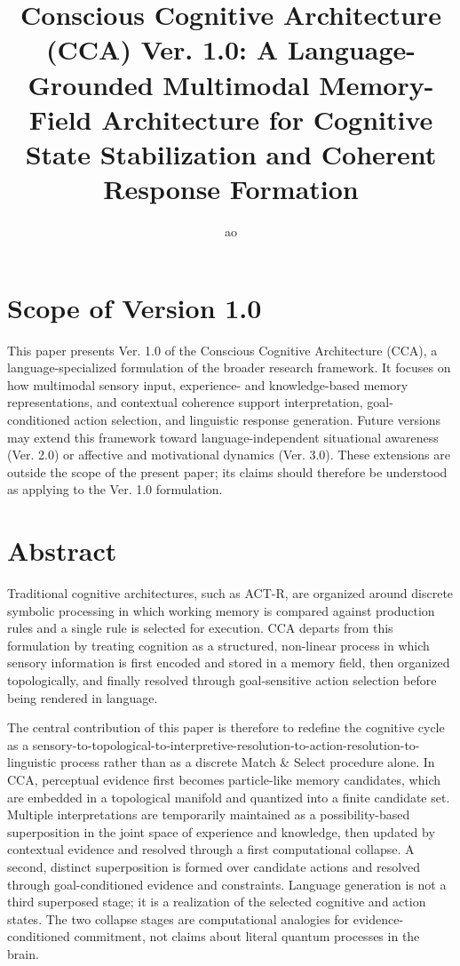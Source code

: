 \documentclass[10pt,journal,compsoc]{IEEEtran}
\title{Conscious Cognitive Architecture (CCA) Ver. 1.0: A Language-Grounded Multimodal Memory-Field Architecture for Cognitive State Stabilization and Coherent Response Formation}
\author{ao}
\begin{document}
\maketitle

\section*{Scope of Version 1.0}

This paper presents Ver. 1.0 of the Conscious Cognitive Architecture (CCA), a language-specialized formulation of the broader research framework. It focuses on how multimodal sensory input, experience- and knowledge-based memory representations, and contextual coherence support interpretation, goal-conditioned action selection, and linguistic response generation. Future versions may extend this framework toward language-independent situational awareness (Ver. 2.0) or affective and motivational dynamics (Ver. 3.0). These extensions are outside the scope of the present paper; its claims should therefore be understood as applying to the Ver. 1.0 formulation.

\section{Abstract}

Traditional cognitive architectures, such as ACT-R, are organized around discrete symbolic processing in which working memory is compared against production rules and a single rule is selected for execution. CCA departs from this formulation by treating cognition as a structured, non-linear process in which sensory information is first encoded and stored in a memory field, then organized topologically, and finally resolved through goal-sensitive action selection before being rendered in language.

The central contribution of this paper is therefore to redefine the cognitive cycle as a sensory-to-topological-to-interpretive-resolution-to-action-resolution-to-linguistic process rather than as a discrete Match \& Select procedure alone. In CCA, perceptual evidence first becomes particle-like memory candidates, which are embedded in a topological manifold and quantized into a finite candidate set. Multiple interpretations are temporarily maintained as a possibility-based superposition in the joint space of experience and knowledge, then updated by contextual evidence and resolved through a first computational collapse. A second, distinct superposition is formed over candidate actions and resolved through goal-conditioned evidence and constraints. Language generation is not a third superposed stage; it is a realization of the selected cognitive and action states. The two collapse stages are computational analogies for evidence-conditioned commitment, not claims about literal quantum processes in the brain.
\end{document}
